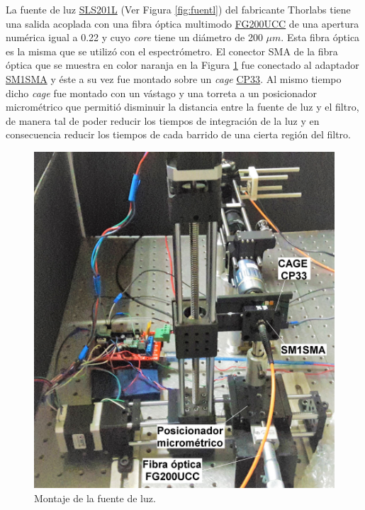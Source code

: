  La fuente de luz \href{https://www.thorlabs.com/newgrouppage9.cfm?objectgroup_id=7269&pn=SLS201L/M}{SLS201L} (Ver Figura \ref{fig:fuentl}) del fabricante Thorlabs tiene una salida acoplada con una fibra óptica multimodo \href{https://www.thorlabs.com/newgrouppage9.cfm?objectgroup_id=6839&pn=FG200UCC}{FG200UCC} de una apertura numérica igual a 0.22 y cuyo \textit{core} tiene un diámetro de 200 $\mu m$. Esta fibra óptica es la misma que se utilizó con el espectrómetro. El conector SMA de la fibra óptica que se muestra en color naranja en la Figura \ref{fig:montttluz} fue conectado al adaptador \href{https://www.thorlabs.com/thorproduct.cfm?partnumber=SM1SMA\#ad-image-0}{SM1SMA} y éste a su vez fue montado sobre un \textit{cage} \href{https://www.thorlabs.com/thorproduct.cfm?partnumber=CP33}{CP33}. Al mismo tiempo dicho \textit{cage} fue montado con un vástago y una torreta a un posicionador micrométrico que permitió disminuir la distancia entre la fuente de luz y el filtro, de manera tal de poder reducir los tiempos de integración de la luz y en consecuencia reducir los tiempos de cada barrido de una cierta región del filtro.
\begin{figure}[H]
	\centering
	\includegraphics[width=1.0\textwidth]{Figs/microespectrometro/setupactualdecote_retoc_condetalles.jpg}
	\caption{Montaje de la fuente de luz.}
	\label{fig:montttluz}
\end{figure}
 
